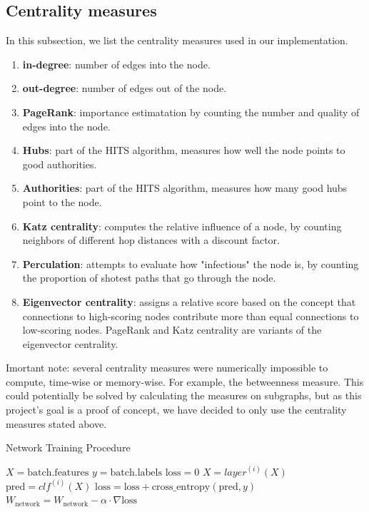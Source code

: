 \documentclass[11pt,a4paper]{article}
\begin{document}
	\subsection*{Centrality measures}
		In this subsection, we list the centrality measures used in our implementation.
		\begin{enumerate}
			\item \textbf{in-degree}: number of edges into the node.
			\item \textbf{out-degree}: number of edges out of the node.
			\item \textbf{PageRank}: importance estimatation by counting the number and quality of edges into the node.
			\item \textbf{Hubs}: part of the HITS algorithm, measures how well the node points to good authorities.
			\item \textbf{Authorities}: part of the HITS algorithm, measures how many good hubs point to the node.
			\item \textbf{Katz centrality}: computes the relative influence of a node, by counting neighbors of different hop distances with a discount factor.
			\item \textbf{Perculation}: attempts to evaluate how "infectious" the node is, by counting the proportion of shotest paths that go through the node.
			\item \textbf{Eigenvector centrality}: assigns a relative score based on the concept that connections to high-scoring nodes contribute more than equal connections to low-scoring nodes. PageRank and Katz centrality are variants of the eigenvector centrality.
		\end{enumerate}
	Imortant note: several centrality measures were numerically impossible to compute, time-wise or memory-wise. For example, the betweenness measure. This could potentially be solved by calculating the measures on subgraphs, but as this project's goal is a proof of concept, we have decided to only use the centrality measures stated above.
	
	\begin{algorithm*}
		\caption{Network Training Procedure}
		\label{alg:NetworkTrainProcedure}
		\begin{algorithmic}[1]
			\State $X = \text{batch.features}$
			\State $y = \text{batch.labels}$
			\State $\text{loss}=0$
			\State $X = layer^{(i)}(X)$
			\State $\text{pred} = clf^{(i)}(X)$
			\State $\text{loss} = \text{loss} + \text{cross\_entropy}(\text{pred}, y)$
			\EndFor
			\State $W_{\text{network}} = W_{\text{network}} - \alpha \cdot \nabla \text{loss}$
			\EndFor
		\end{algorithmic} 
	\end{algorithm*}
\end{document}
